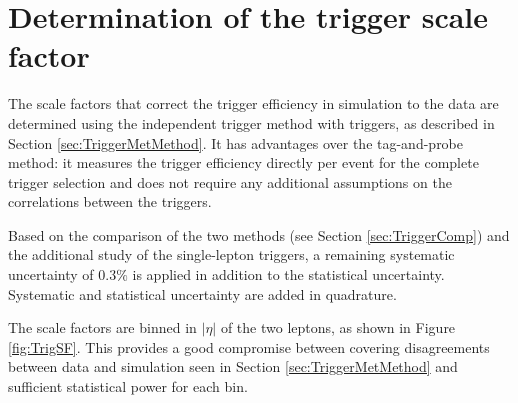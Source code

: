 \section{Determination of the trigger scale factor}

\label{sec:TrigSF}

The scale factors that correct the trigger efficiency in simulation to the data are determined using the independent trigger method with \ETm triggers, as described in Section \ref{sec:TriggerMetMethod}. 
It has advantages over the tag-and-probe method: it measures the trigger efficiency directly per event for the complete trigger selection and does not require any additional assumptions on the correlations between the triggers.

Based on the comparison of the two methods (see Section \ref{sec:TriggerComp}) and the additional study of the single-lepton triggers, a remaining systematic uncertainty of $0.3\%$ is applied in addition to the statistical uncertainty.
Systematic and statistical uncertainty are added in quadrature. 

The scale factors are binned in $|\eta|$ of the two leptons, as shown in Figure \ref{fig:TrigSF}. This provides a good compromise between covering disagreements between data and simulation seen in Section \ref{sec:TriggerMetMethod} and sufficient statistical power for each bin.


